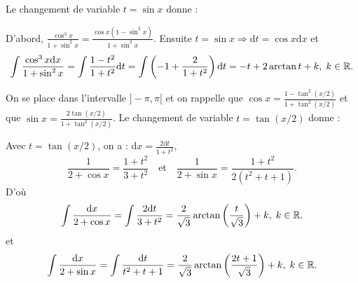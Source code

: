 \begin{question}
Le changement de variable $t=\sin x$ donne :
\begin{answers}  
\end{answers}
\vskip2mm
\begin{explanations}
D'abord, $\displaystyle \frac{\cos ^3x}{1+\sin ^2x}=\frac{\cos x(1-\sin ^2x)}{1+\sin ^2x}$. Ensuite $t=\sin x\Rightarrow\mathrm{d}t=\cos x\mathrm{d}x$ et
$$\int \frac{\cos ^3x\mathrm{d}x}{1+\sin ^2x}=\int \frac{1-t^2}{1+t^2}\mathrm{d}t=\int \left(-1+\frac{2}{1+t^2}\right)\mathrm{d}t=-t+2\arctan t+k,\; k\in \mathbb{R}.$$
\end{explanations}
\end{question}


\begin{question}
On se place dans l'intervalle $]-\pi,\pi[$ et on rappelle que $\displaystyle \cos x=\frac{1-\tan ^2(x/2)}{1+\tan ^2(x/2)}$ et que $\displaystyle \sin x=\frac{2\tan (x/2)}{1+\tan ^2(x/2)}$. Le changement de variable $t=\tan (x/2)$ donne :
\begin{answers}
\end{answers}
\vskip2mm
\begin{explanations}
Avec $t=\tan (x/2)$, on a : $\displaystyle \mathrm{d}x=\frac{2\mathrm{d}t}{1+t^2}$,
$$\frac{1}{2+\cos x}=\frac{1+t^2}{3+t^2}\quad \mbox{et}\quad \frac{1}{2+\sin x}=\frac{1+t^2}{2(t^2+t+1)}.$$
D'où
$$\int \frac{\mathrm{d}x}{2+\cos x}=\int \frac{2\mathrm{d}t}{3+t^2}=\frac{2}{\sqrt{3}}\arctan\left(\frac{t}{\sqrt{3}}\right)+k,\; k\in \mathbb{R}.$$
et
$$\int \frac{\mathrm{d}x}{2+\sin x}=\int \frac{\mathrm{d}t}{t^2+t+1}=\frac{2}{\sqrt{3}}\arctan\left(\frac{2t+1}{\sqrt{3}}\right)+k,\; k\in \mathbb{R}.$$
\end{explanations}
\end{question}

